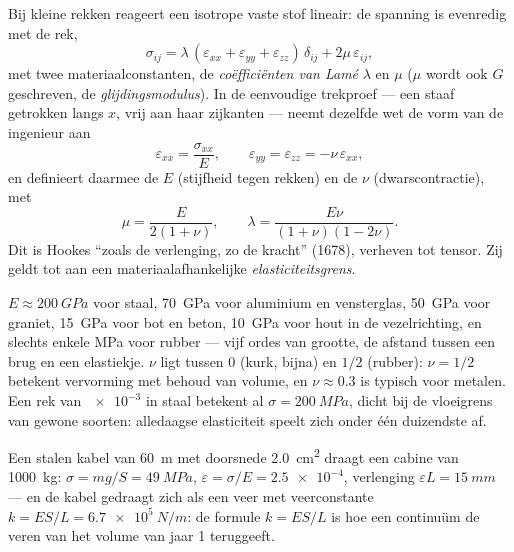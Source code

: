 \begin{theorem}\label{thm:b3:continuum-elasticity:hooke}
Bij kleine rekken reageert een isotrope vaste stof lineair: de spanning
is evenredig met de rek,
\[
\sigma_{ij} = \lambda\,(\varepsilon_{xx} + \varepsilon_{yy} +
\varepsilon_{zz})\,\delta_{ij} + 2\mu\,\varepsilon_{ij} ,
\]
met twee materiaalconstanten, de \emph{coëfficiënten van Lamé} $\lambda$
en $\mu$ ($\mu$ wordt ook $G$ geschreven, de \emph{glijdingsmodulus}). In
de eenvoudige trekproef --- een staaf getrokken langs $x$, vrij aan haar
zijkanten --- neemt dezelfde wet de vorm van de ingenieur aan
\[
\varepsilon_{xx} = \frac{\sigma_{xx}}{E} , \qquad
\varepsilon_{yy} = \varepsilon_{zz} = -\nu\,\varepsilon_{xx} ,
\]
en definieert daarmee de \emph{} $E$ (stijfheid tegen
rekken) en de \emph{} $\nu$ (dwarscontractie), met
\[
\mu = \frac{E}{2(1 + \nu)} , \qquad
\lambda = \frac{E\nu}{(1 + \nu)(1 - 2\nu)} .
\]
Dit is Hookes ``zoals de verlenging, zo de kracht'' (1678), verheven tot
tensor. Zij geldt tot aan een materiaalafhankelijke \emph{elasticiteitsgrens}.
\end{theorem}
\admitted

\begin{remark}\label{rem:b3:continuum-elasticity:orders}
$E \approx \qty{200}{GPa}$ voor staal, \qty{70}{GPa} voor aluminium en
vensterglas, \qty{50}{GPa} voor graniet, \qty{15}{GPa} voor bot en beton,
\qty{10}{GPa} voor hout in de vezelrichting, en slechts enkele MPa voor
rubber --- vijf ordes van grootte, de afstand tussen een brug en een
elastiekje. $\nu$ ligt tussen $0$ (kurk, bijna) en $1/2$ (rubber): $\nu = 1/2$ betekent vervorming met behoud van volume, en $\nu \approx 0.3$ is
typisch voor metalen. Een rek van $\num{e-3}$ in staal betekent al
$\sigma = \qty{200}{MPa}$, dicht bij de vloeigrens van gewone soorten:
alledaagse elasticiteit speelt zich onder één duizendste af.
\end{remark}

\begin{example}\label{ex:b3:continuum-elasticity:cable}
Een stalen kabel van \qty{60}{m} met doorsnede \qty{2.0}{cm^2} draagt een
cabine van \qty{1000}{kg}: $\sigma = mg/S = \qty{49}{MPa}$, $\varepsilon =
\sigma/E = \num{2.5e-4}$, verlenging $\varepsilon L = \qty{15}{mm}$ ---
en de kabel gedraagt zich als een veer met veerconstante $k = ES/L =
\qty{6.7e5}{N/m}$: de formule $k = ES/L$ is hoe een continuüm de veren
van het volume van jaar 1 teruggeeft.
\end{example}

